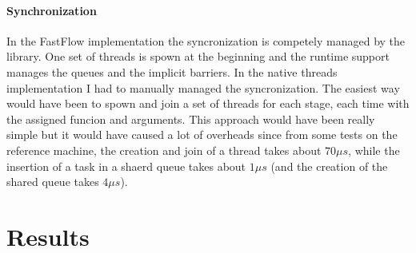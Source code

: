 \documentclass[12pt, letterpaper]{article}  %
\begin{document}
\paragraph*{Synchronization}
In the FastFlow implementation the syncronization is competely managed by the library. One set of threads
is spown at the beginning and the runtime support manages the queues and the implicit barriers.
In the native threads implementation I had to manually managed the syncronization. The easiest way
would have been to spown and join a set of threads for each stage, each time with the assigned funcion 
and arguments. This approach would have been really simple but it would have caused a lot of overheads since
from some tests on the reference machine, the creation and join of a thread takes about $70 \mu s$, while the 
insertion of a task in a shaerd queue takes about $1 \mu s$ (and the creation of the shared queue takes $4 \mu s$).




\section{Results \label{sec:results}}



\newpage \FloatBarrier


\end{document}
